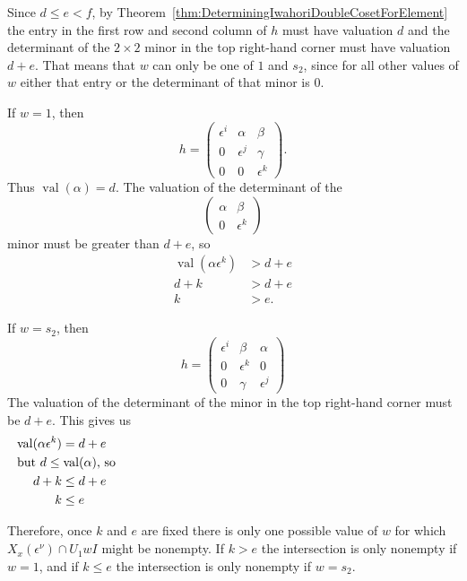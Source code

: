 \documentclass{amsart}
\theoremstyle{definition}
\def\e{\epsilon}
\def\val{\mathop{\mathrm{val}}}
\def\en{\e^{\nu}}
\def\X{X_x(\en)}
\begin{document}
  Since $d \le e < f$, by
  Theorem~\ref{thm:DeterminingIwahoriDoubleCosetForElement} the entry in the
  first row and second column of $h$ must have valuation $d$ and the
  determinant of the $2 \times 2$ minor in the top right-hand corner must have
  valuation $d + e$.  That means that $w$ can only be one of $1$ and $s_2$,
  since for all other values of $w$ either that entry or the determinant of
  that minor is 0.

  If $w = 1$, then
  \begin{equation*}
    h = \begin{pmatrix}
      \e^i & \alpha & \beta \\
      0 & \e^j & \gamma \\
      0 & 0 & \e^k
    \end{pmatrix}.
  \end{equation*}
  Thus $\val(\alpha) = d$.  The valuation of the determinant of the
  \begin{equation*}
    \begin{pmatrix}\alpha & \beta \\ 0 & \e^k\end{pmatrix}
  \end{equation*}
  minor must be greater than $d + e$, so
  \begin{align*}
    \val(\alpha\e^k) & > d + e \\
    d + k &> d + e \\
    k & > e.
  \end{align*}

  If $w = s_2$, then
  \begin{equation*}
    h = \begin{pmatrix}
      \e^i & \beta & \alpha \\
      0 & \e^k & 0 \\
      0 & \gamma & \e^j
    \end{pmatrix}
  \end{equation*}
  The valuation of the determinant of the minor in the top right-hand corner
  must be $d + e$.  This gives us
  \begin{align*}
    \val(\alpha\e^k) &=  d + e  \\
    \noalign{\noindent but $d \le\val(\alpha)$, so}
    d+ k &\le d +e \\
    k &\le e
  \end{align*}
  
  Therefore, once $k$ and $e$ are fixed there is only one possible value of $w$
  for which $\X \cap U_1 wI$ might be nonempty.  If $k > e$ the intersection is
  only nonempty if $w = 1$, and if $k \le e$ the intersection is only nonempty
  if $w = s_2$.
\end{document}
